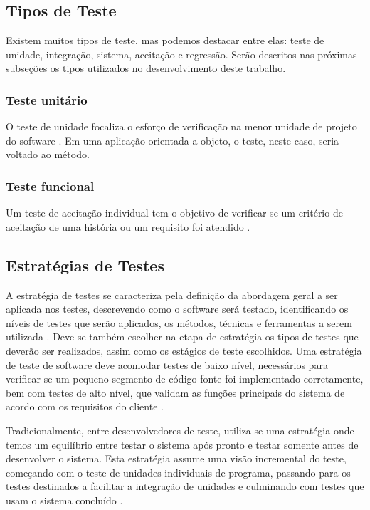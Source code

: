 \documentclass[tg]{mdtufsm}
\begin{document}
\subsection{Tipos de Teste}
Existem muitos tipos de teste, mas podemos destacar entre elas: teste de unidade, integração, sistema, aceitação e regressão. Serão descritos nas próximas subseções os tipos utilizados no desenvolvimento deste trabalho.

\subsubsection{Teste unitário}
O teste de unidade focaliza o esforço de verificação na menor unidade de projeto do software \cite{pressman2011engenharia}. Em uma aplicação orientada a objeto, o teste, neste caso, seria voltado ao método.

\subsubsection{Teste funcional}
Um teste de aceitação individual tem o objetivo de verificar se um critério de aceitação de uma história ou um requisito foi atendido \cite{dornbusch2014entrega}.
 
\subsection{Estratégias de Testes}
A estratégia de testes se caracteriza pela definição da abordagem geral a ser aplicada nos testes, descrevendo como o software será testado, identificando os níveis de testes que serão aplicados, os métodos,
técnicas e ferramentas a serem utilizada \cite{rios2006teste}. Deve-se também escolher na etapa de estratégia os tipos de testes que deverão ser realizados, assim como os estágios de teste escolhidos. Uma estratégia de teste de software deve acomodar testes de baixo nível, necessários para verificar se um pequeno segmento de código fonte foi implementado corretamente, bem com testes de alto nível, que validam as funções principais do sistema de acordo com os requisitos do cliente \cite{pressman2011engenharia}.

Tradicionalmente, entre desenvolvedores de teste, utiliza-se uma estratégia onde temos um equilíbrio entre testar o sistema após pronto e testar somente antes de desenvolver o sistema. Esta estratégia assume uma visão incremental do teste, começando com o teste de unidades individuais de programa, passando para os testes destinados a facilitar a integração de unidades e culminando com testes que usam o sistema concluído \cite{pressman2011engenharia}.
\end{document}
